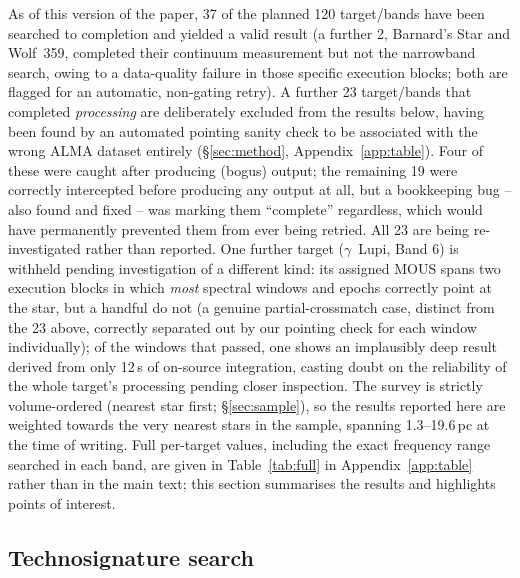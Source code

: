 \documentclass{openjournal}
\begin{document}
As of this version of the paper, 37 of the planned 120 target/bands have
been searched to completion and yielded a valid result (a further 2,
Barnard's Star and Wolf~359, completed their continuum measurement but
not the narrowband search, owing to a data-quality failure in those
specific execution blocks; both are flagged for an automatic, non-gating
retry). A further 23 target/bands that completed \emph{processing} are
deliberately excluded from the results below, having been found by an
automated pointing sanity check to be associated with the wrong ALMA
dataset entirely (\S\ref{sec:method}, Appendix~\ref{app:table}). Four of
these were caught after producing (bogus) output; the remaining 19 were
correctly intercepted before producing any output at all, but a
bookkeeping bug -- also found and fixed -- was marking them ``complete''
regardless, which would have permanently prevented them from ever being
retried. All 23 are being re-investigated rather than reported. One
further target ($\gamma$~Lupi, Band 6) is withheld pending investigation
of a different kind: its assigned MOUS spans two execution blocks in
which \emph{most} spectral windows and epochs correctly point at the
star, but a handful do not (a genuine partial-crossmatch case, distinct
from the 23 above, correctly separated out by our pointing check for
each window individually); of the windows that passed, one shows an
implausibly deep result derived from only 12\,s of on-source
integration, casting doubt on the reliability of the whole target's
processing pending closer inspection. The survey is strictly
volume-ordered (nearest star first; \S\ref{sec:sample}), so the results
reported here are weighted towards the very nearest stars in the sample,
spanning 1.3--19.6\,pc at the time of writing. Full per-target values,
including the exact frequency range searched in each band, are given in
Table~\ref{tab:full} in Appendix~\ref{app:table} rather than in the main
text; this section summarises the results and highlights points of
interest.

\subsection{Technosignature search}
\end{document}
